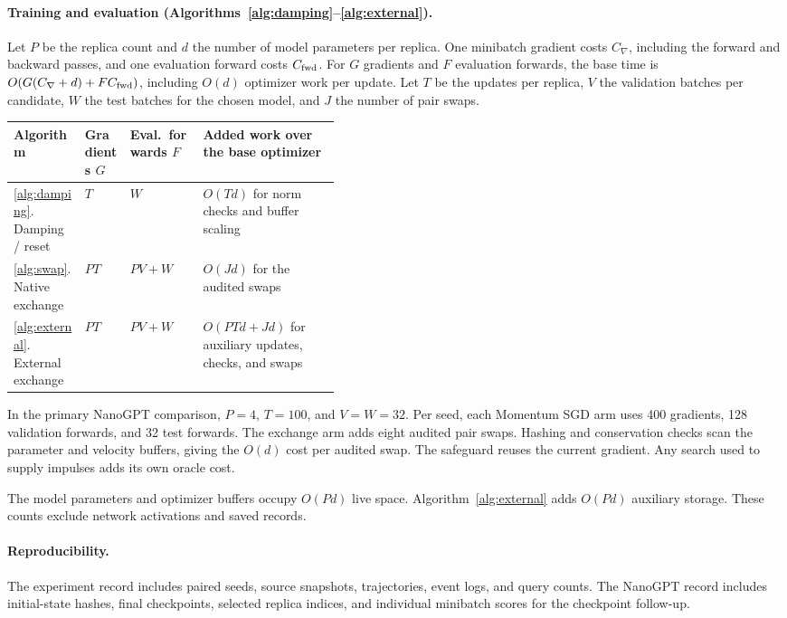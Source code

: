 \documentclass[10pt,letterpaper]{article}
\begin{document}
\paragraph{Training and evaluation (Algorithms~\ref{alg:damping}--\ref{alg:external}).}
Let \(P\) be the replica count and \(d\) the number of model parameters per replica. One minibatch gradient costs \(C_\nabla\), including the forward and backward passes, and one evaluation forward costs \(C_{\rm fwd}\). For \(G\) gradients and \(F\) evaluation forwards, the base time is \(O(G(C_\nabla+d)+FC_{\rm fwd})\), including \(O(d)\) optimizer work per update. Let \(T\) be the updates per replica, \(V\) the validation batches per candidate, \(W\) the test batches for the chosen model, and \(J\) the number of pair swaps.

\begin{center}
\small
\begin{tabular}{@{}lllp{0.42\linewidth}@{}}
\toprule
Algorithm & Gradients \(G\) & Eval.\ forwards \(F\) & Added work over the base optimizer\\
\midrule
\ref{alg:damping}. Damping / reset & \(T\) & \(W\) & \(O(Td)\) for norm checks and buffer scaling\\
\ref{alg:swap}. Native exchange & \(PT\) & \(PV+W\) & \(O(Jd)\) for the audited swaps\\
\ref{alg:external}. External exchange & \(PT\) & \(PV+W\) & \(O(PTd+Jd)\) for auxiliary updates, checks, and swaps\\
\bottomrule
\end{tabular}
\end{center}

In the primary NanoGPT comparison, \(P=4\), \(T=100\), and \(V=W=32\). Per seed, each Momentum SGD arm uses 400 gradients, 128 validation forwards, and 32 test forwards. The exchange arm adds eight audited pair swaps. Hashing and conservation checks scan the parameter and velocity buffers, giving the \(O(d)\) cost per audited swap. The safeguard reuses the current gradient. Any search used to supply impulses adds its own oracle cost.

The model parameters and optimizer buffers occupy \(O(Pd)\) live space. Algorithm~\ref{alg:external} adds \(O(Pd)\) auxiliary storage. These counts exclude network activations and saved records.

\paragraph{Reproducibility.}
The experiment record includes paired seeds, source snapshots, trajectories, event logs, and query counts. The NanoGPT record includes initial-state hashes, final checkpoints, selected replica indices, and individual minibatch scores for the checkpoint follow-up.
\end{document}
